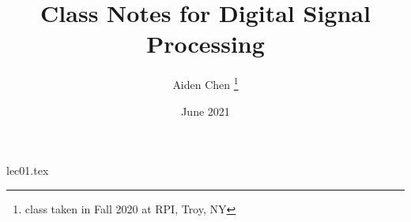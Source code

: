 \documentclass[12pt, letterpaper]{article}
\title{Class Notes for Digital Signal Processing}
\author{Aiden Chen \thanks{class taken in Fall 2020 at RPI, Troy, NY}}
\date{June 2021}
\begin{document}
\begin{titlepage}
    \maketitle
\end{titlepage}

{lec01.tex}
\end{document}
